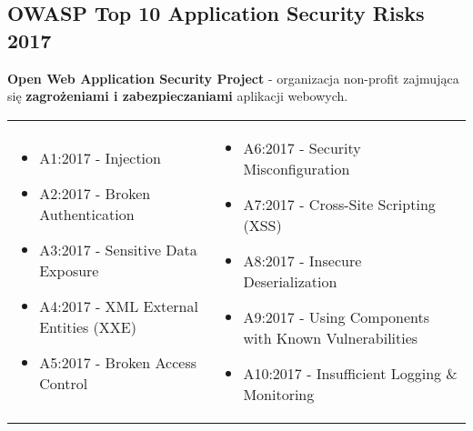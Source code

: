 \documentclass[../main.tex]{subfiles}
\begin{document}
    \subsection{OWASP Top 10 Application Security Risks 2017}
    \textbf{Open Web Application Security Project} - organizacja non-profit zajmująca się \textbf{zagrożeniami i zabezpieczaniami} aplikacji
    webowych.
    \begin{table}[H]
        \begin{center}
            \begin{tabular}{p{7cm} p{10cm}}
                \begin{itemize}
                    \item A1:2017 - Injection
                    \item A2:2017 - Broken Authentication
                    \item A3:2017 - Sensitive Data Exposure
                    \item A4:2017 - XML External Entities (XXE)
                    \item A5:2017 - Broken Access Control
                \end{itemize}
                &
                \begin{itemize}
                    \item A6:2017 - Security Misconfiguration
                    \item A7:2017 - Cross-Site Scripting (XSS)
                    \item A8:2017 - Insecure Deserialization
                    \item A9:2017 - Using Components with Known Vulnerabilities
                    \item A10:2017 - Insufficient Logging \& Monitoring
                \end{itemize}
            \end{tabular}
        \end{center}
    \end{table}
\end{document}
